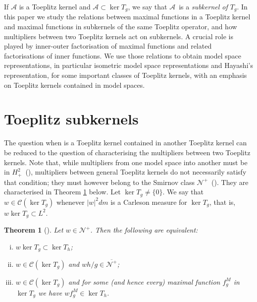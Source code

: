 \documentclass{article}
\numberwithin{equation}{section}
\theoremstyle{plain}
\newtheorem{thm}{Theorem}[section]
\newcommand{\ds}{\displaystyle}
\newcommand{\Hp}{\ensuremath{H^2_+}}
\renewcommand{\AA}{\ensuremath{\mathcal{A}}}
\newcommand{\CCC}{\ensuremath{\mathcal{C}}}
\newcommand{\NN}{\ensuremath{\mathcal{N}^+}}
\newcommand{\ol}[1]{\ensuremath{\overline{#1}}}
\newcommand{\zero}{\ensuremath{\{0\}}}
\newcommand{\kertg}{\ensuremath{\ker T_g}}
\begin{document}
If $\AA$ is a Toeplitz kernel and $\AA \subset \kertg$, we say that \AA\ is a {\em subkernel of $T_g$}.
In this paper we study the relations between maximal functions in a Toeplitz kernel and maximal functions in subkernels of the same Toeplitz operator, and how multipliers between two Toeplitz kernels act on subkernels.
A crucial role is played by inner-outer factorisation of maximal functions and related factorisations of inner functions.
We use those relations to obtain model space representations, in particular isometric model space representations and Hayashi's representation, for some important classes of Toeplitz kernels, with an emphasis on Toeplitz kernels contained in model spaces.






\section{Toeplitz subkernels}
\label{sec:Toeplitz_subkernels}


The question when is a Toeplitz kernel contained in another Toeplitz kernel can be reduced to the question of characterising the multipliers between two Toeplitz kernels.
Note that, while multipliers from one model space into another must be in \Hp\ (\cite{FriHarRoss18}), multipliers between general Toeplitz kernels do not necessarily satisfy that condition;
they must however belong to the Smirnov class \NN\ (\cite{CP18_multipliers}).
They are characterised in Theorem \ref{thm:multiplicadores_into_kernels} below.
Let $\kertg\neq\zero$.
We say that $w\in\CCC(\kertg)$ whenever $|w|^2dm$ is a Carleson measure for \kertg, that is, $w\kertg \subset L^2$.


\begin{thm}[{\cite[Theorem 2.5]{CP18_multipliers}}]
\label{thm:multiplicadores_into_kernels}
Let $w\in\NN$.
Then the following are equivalent:
\begin{enumerate}[(i)]
\item $w \ker T_g \subset \ker T_h$;

\item $w\in\CCC(\kertg)$ and $\ds w h/g \in \ol\NN$;

\item $w\in\CCC(\kertg)$ and for some (and hence every) maximal function $\ds f^M_g$ in $\ker T_g$ we have $\ds w f^M_g \in \ker T_h$.
\end{enumerate}
\end{thm}
\end{document}
